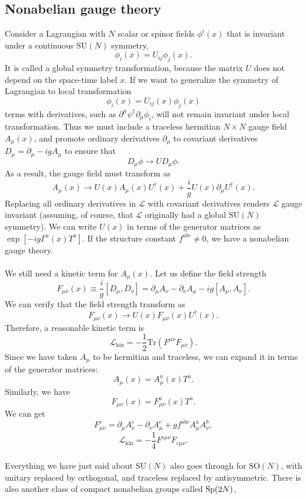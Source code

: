 \subsection{Nonabelian gauge theory}
Consider a Lagrangian with $N$ scalar or spinor fields $\phi^i(x)$ that is invariant under a continuous $\mathrm{SU}(N)$ symmetry,
\[\phi_i(x) = U_{ij}\phi_j(x).\]
It is called a global symmetry transformation, because the matrix $U$ does not depend on the space-time label $x$.
If we want to generalize the symmetry of Lagrangian to local transformation
\[\phi_i(x) = U_{ij}(x)\phi_j(x)\]
terms with derivatives, such as $\partial^{\mu}\psi^{\dagger} \partial_{\mu}\phi_i$, will not remain invariant under local transformation. 
Thus we must include a traceless hermitian $N \times N$ gauge field $A_{\mu}(x)$, and promote ordinary derivatives $\partial_{\mu}$ to covariant derivatives $D_{\mu} = \partial_{\mu} - igA_{\mu}$ to ensure that
\[D_{\mu}\phi \to UD_{\mu}\phi.\]
As a result, the gauge field must transform as
\[A_{\mu}(x) \to U(x)A_{\mu}(x)U^{\dagger}(x) + \frac{i}{g}U(x)\partial_{\mu}U^{\dagger}(x).\]
Replacing all ordinary derivatives in $\mathcal{L}$ with covariant derivatives renders $\mathcal{L}$ gauge invariant (assuming, of course, that $\mathcal{L}$ originally had a global $\mathrm{SU}(N)$ symmetry).
We can write $U(x)$ in terms of the generator matrices as
$\exp[-ig\Gamma^a(x)T^a]$. If the structure constant $f^{abc} \neq 0$, we have a nonabelian gauge theory.
\\ \\
We still need a kinetic term for $A_{\mu}(x)$. Let us define the field strength
\[F_{\mu\nu}(x) \equiv \frac{i}{g}[D_{\mu},D_{\nu}] = \partial_{\mu}A_{\nu} - \partial_{\nu}A_{\mu} - ig[A_{\mu},A_{\nu}].\]
We can verify that the field strength transform as
\[F_{\mu\nu}(x) \to U(x)F_{\mu\nu}(x)U^{\dagger}(x).\]
Therefore, a reasonable kinetic term is
\[\mathcal{L}_{\mathrm{kin}} = - \frac{1}{2} \mathrm{Tr}(F^{\mu\nu}F_{\mu\nu}).\]
Since we have taken $A_{\mu}$ to be hermitian and traceless, we can expand it in terms of the generator matrices:
\[A_{\mu}(x) = A^a_{\mu}(x)T^a.\]
Similarly, we have
\[F_{\mu\nu}(x) = F^a_{\mu\nu}(x)T^a .\]
We can get
\[F^{c}_{\mu\nu} = \partial_{\mu}A^c_{\nu} - \partial_{\nu}A^c_{\mu} + gf^{abc}A^a_{\mu}A^b_{\nu},\]
\[\mathcal{L}_{\mathrm{kin}} = -\frac{1}{4}F^{c\mu\nu}F_{c\mu\nu}.\]
\\
Everything we have just said about $\mathrm{SU}(N)$ also goes through for $\mathrm{SO}(N)$, with unitary replaced by orthogonal, and traceless replaced by antisymmetric. There is also another class of compact nonabelian groups called ${\rm Sp}(2N)$,
